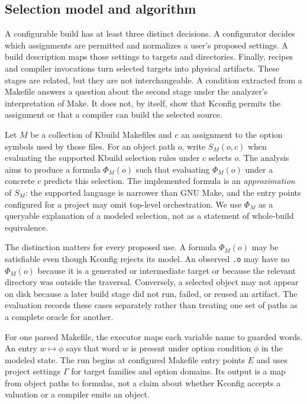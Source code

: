 \documentclass[acmsmall,screen,review]{acmart}
\begin{document}
\subsection{Selection model and algorithm}
A configurable build has at least three distinct decisions. A configurator decides which assignments are permitted and normalizes a user's proposed settings. A build description maps those settings to targets and directories. Finally, recipes and compiler invocations turn selected targets into physical artifacts. These stages are related, but they are not interchangeable. A condition extracted from a Makefile answers a question about the second stage under the analyzer's interpretation of Make. It does not, by itself, show that Kconfig permits the assignment or that a compiler can build the selected source.

Let $M$ be a collection of Kbuild Makefiles and $c$ an assignment to the option symbols used by those files. For an object path $o$, write $S_M(o,c)$ when evaluating the supported Kbuild selection rules under $c$ selects $o$. The analysis aims to produce a formula $\Phi_M(o)$ such that evaluating $\Phi_M(o)$ under a concrete $c$ predicts this selection. The implemented formula is an \emph{approximation} of $S_M$: the supported language is narrower than GNU Make, and the entry points configured for a project may omit top-level orchestration. We use $\Phi_M$ as a queryable explanation of a modeled selection, not as a statement of whole-build equivalence.

The distinction matters for every proposed use. A formula $\Phi_M(o)$ may be satisfiable even though Kconfig rejects its model. An observed \texttt{.o} may have no $\Phi_M(o)$ because it is a generated or intermediate target or because the relevant directory was outside the traversal. Conversely, a selected object may not appear on disk because a later build stage did not run, failed, or reused an artifact. The evaluation records these cases separately rather than treating one set of paths as a complete oracle for another.


For one parsed Makefile, the executor maps each variable name to guarded words. An entry $w\mapsto\phi$ says that word $w$ is present under option condition $\phi$ in the modeled state. The run begins at configured Makefile entry points $E$ and uses project settings $\Gamma$ for target families and option domains. Its output is a map from object paths to formulas, not a claim about whether Kconfig accepts a valuation or a compiler emits an object.
\end{document}
